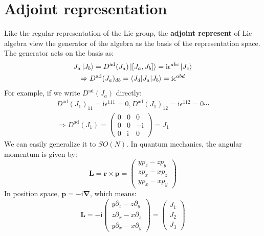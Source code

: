 \documentclass{article}
\begin{document}
	\section{Adjoint representation}
	
	Like the regular representation of the Lie group, the \textbf{adjoint represent} of Lie algebra view the generator of the algebra as the basis of the representation space. The generator acts on the basis as:
	\begin{gather*}
		J_{a}\ket{J_{b}} =D^{\mathrm{ad}}( J_{a})\ket{[ J_{a} ,J_{b}]} =\mathrm{i} \epsilon ^{abc}\ket{J_{c}}\\
		\Rightarrow D^{\mathrm{ad}}( J_{a})_{db} =\mel**{J_{d}}{J_{a}}{J_{b}} =\mathrm{i} \epsilon ^{abd}
	\end{gather*}
	For example, if we write $D^{\mathrm{ad}}( J_{a})$ directly:
	\begin{gather*}
		D^{\mathrm{ad}}( J_{1})_{11} =\mathrm{i} \epsilon ^{111} =0,D^{\mathrm{ad}}( J_{1})_{12} =\mathrm{i} \epsilon ^{112} =0\cdots \\
		\Rightarrow D^{\mathrm{ad}}( J_{1}) =\begin{pmatrix}
			0 & 0 & 0\\
			0 & 0 & -\mathrm{i}\\
			0 & \mathrm{i} & 0
		\end{pmatrix} =J_{1}
	\end{gather*}
	We can easily generalize it to $SO( N)$. In quantum mechanics, the angular momentum is given by:
	\begin{equation*}
		\mathbf{L} =\mathbf{r} \times \mathbf{p} =\begin{pmatrix}
			yp_{z} -zp_{y}\\
			zp_{x} -xp_{z}\\
			yp_{x} -xp_{y}
		\end{pmatrix}
	\end{equation*}
	In position space, $\mathbf{p} =-\mathrm{i}\mathbf{\nabla }$, which means:
	\begin{equation*}
		\mathbf{L} =-\mathrm{i}\begin{pmatrix}
			y\partial _{z} -z\partial _{y}\\
			z\partial _{x} -x\partial _{z}\\
			y\partial _{x} -x\partial _{y}
		\end{pmatrix} =\begin{pmatrix}
			J_{1}\\
			J_{2}\\
			J_{3}
		\end{pmatrix}
	\end{equation*}
\end{document}
